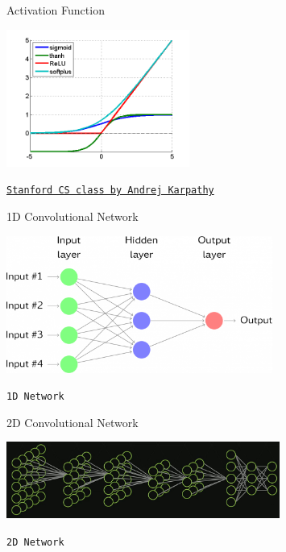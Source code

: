 \documentclass[12pt,t]{beamer}
\begin{document}
\begin{frame}[c]{Activation Function}

\includegraphics[height=45mm]{Figs/activations.png}

\hfill
{\footnotesize \lolit
\href{http://cs231n.github.io/convolutional-networks/}{\tt Stanford CS class by Andrej Karpathy}
}

\end{frame}


\begin{frame}[c]{1D Convolutional Network}

\includegraphics[height=45mm]{Figs/neuralnet.png}

\hfill
{\footnotesize \lolit
{\tt 1D Network}
}

\end{frame}

\begin{frame}[c]{2D Convolutional Network}

\includegraphics[height=25mm]{Figs/nvidia.jpg}

\hfill
{\footnotesize \lolit
{\tt 2D Network}
}

\end{frame}
\end{document}
